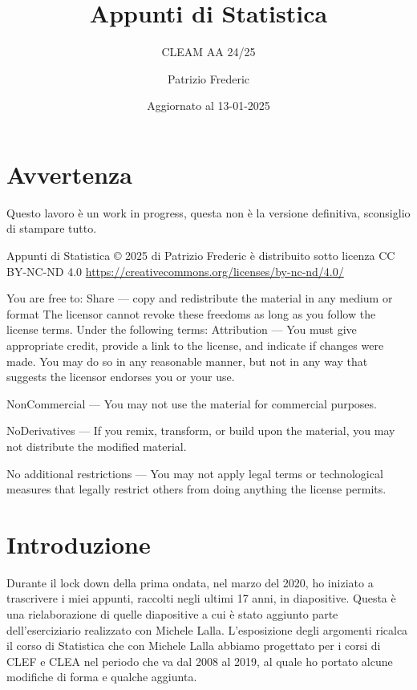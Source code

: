 \documentclass[
  11pt,
]{book}
\title{Appunti di Statistica}
\subtitle{CLEAM AA 24/25}
\author{Patrizio Frederic}
\date{Aggiornato al 13-01-2025}
\theoremstyle{mytheoremstyle}
\theoremstyle{mydefstyle}
\begin{document}
\maketitle

{
\setcounter{tocdepth}{2}
\tableofcontents
}
\chapter*{Avvertenza}\label{avvertenza}

\large

Questo lavoro è un work in progress, questa non è la versione definitiva, sconsiglio di stampare tutto.

\normalsize

Appunti di Statistica © 2025 di Patrizio Frederic è distribuito
sotto licenza CC BY-NC-ND 4.0
\url{https://creativecommons.org/licenses/by-nc-nd/4.0/}

You are free to:
Share --- copy and redistribute the material in any medium or format
The licensor cannot revoke these freedoms as long as you follow the license terms.
Under the following terms:
Attribution --- You must give appropriate credit, provide a link to the license, and indicate if changes were made. You may do so in any reasonable manner, but not in any way that suggests the licensor endorses you or your use.

NonCommercial --- You may not use the material for commercial purposes.

NoDerivatives --- If you remix, transform, or build upon the material, you may not distribute the modified material.

No additional restrictions --- You may not apply legal terms or technological measures that legally restrict others from doing anything the license permits.

\chapter*{Introduzione}\label{introduzione}

Durante il lock down della prima ondata, nel marzo del 2020, ho iniziato a trascrivere
i miei appunti, raccolti negli ultimi 17 anni, in diapositive. Questa è una rielaborazione
di quelle diapositive a cui è stato aggiunto parte dell'eserciziario realizzato con Michele Lalla.
L'esposizione degli argomenti ricalca il corso di Statistica che con Michele Lalla abbiamo
progettato per i corsi di CLEF e CLEA nel periodo che va dal 2008 al 2019, al quale ho
portato alcune modifiche di forma e qualche aggiunta.
\end{document}
